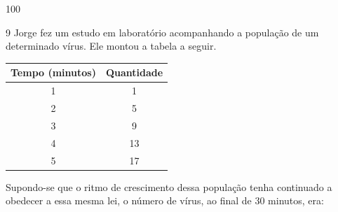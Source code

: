 \begin{escolha}
\begin{escolha}
\begin{escolha}
\begin{escolha}
{\begin{boxmedio}
\begin{boxpeq}
\begin{q°}
\begin{boxmedio}
\begin{boxpeq}
\begin{boxpeq}
\begin{boxmedio}
\begin{boxmedio}
\begin{boxmedio}
\begin{largebox}
\begin{boxmedio}
{\begin{escolha}
\begin{escolha}
\begin{escolha}
\begin{escolha}
\begin{escolha}
\begin{escolha}
\begin{escolha}
  \item 100

\end{escolha}


\num{9} Jorge fez um estudo em laboratório acompanhando a população de um
determinado vírus. Ele montou a tabela a seguir.

\begin{table}[]
\begin{tabular}{|c|c|}
\hline
\rowcolor[HTML]{CD9934} 
\textbf{Tempo (minutos)} & \textbf{Quantidade} \\ \hline
\rowcolor[HTML]{FFCE93} 
1 & 1 \\ \hline
2 & 5 \\ \hline
\rowcolor[HTML]{FFCE93} 
{\color[HTML]{333333} 3} & {\color[HTML]{333333} 9} \\ \hline
4 & 13 \\ \hline
\rowcolor[HTML]{FFCE93} 
{\color[HTML]{333333} 5} & {\color[HTML]{333333} 17} \\ \hline
\end{tabular}
\end{table}

Supondo-se que o ritmo de crescimento dessa população tenha continuado a
obedecer a essa mesma lei, o número de vírus, ao final de 30 minutos,
era:

\begin{escolha}


\end{escolha}
\end{escolha}
\end{escolha}
\end{escolha}
\end{escolha}
\end{escolha}
\end{escolha}}
\end{boxmedio}
\end{largebox}
\end{boxmedio}
\end{boxmedio}
\end{boxmedio}
\end{boxpeq}
\end{boxpeq}
\end{boxmedio}
\end{q°}
\end{boxpeq}
\end{boxmedio}}
\end{escolha}
\end{escolha}
\end{escolha}
\end{escolha}
